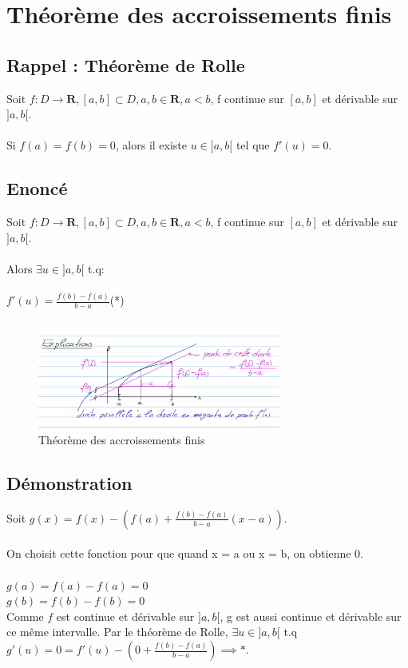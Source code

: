 \documentclass{article}
\begin{document}
\newpage

\section{Théorème des accroissements finis}

\subsection{Rappel : Théorème de Rolle}

Soit $ f : D \to \mathbf{R}, [a,b] \subset D, a, b \in \mathbf{R}, a < b $, f continue sur $ [a, b] $ et dérivable sur $]a, b[$.\\\\
Si $ f(a) = f(b) = 0 $, alors il existe $ u \in ]a, b[ $ tel que $ f'(u) = 0 $.

\subsection{Enoncé}

Soit $ f : D \to \mathbf{R}, [a,b] \subset D, a, b \in \mathbf{R}, a < b $, f continue sur $ [a, b] $ et dérivable sur $]a, b[$.\\\\
Alors $ \exists u \in ]a, b[$ t.q:\\\\
$ f'(u) = \frac{f(b) -f(a)}{b - a}$(*)\\\\
\begin{figure}[htp]
    \centering
    \includegraphics[width=8cm]{Images/accroissements.png}
    \caption{Théorème des accroissements finis}
\end{figure}

\subsection{Démonstration}

Soit $ g(x) = f(x) - (f(a) + \frac{f(b) - f(a)}{b - a}(x-a))$.\\\\
On choisit cette fonction pour que quand x = a ou x = b, on obtienne 0.\\\\
$ g(a) = f(a) - f(a) = 0 $\\
$ g(b) = f(b) - f(b) = 0 $\\
Comme $f$ est continue et dérivable sur $ ]a, b[$, g est aussi continue et dérivable sur ce même intervalle. Par le théorème de Rolle, $ \exists u \in ]a, b[ $ t.q $ g'(u) = 0 = f'(u) - (0 + \frac{f(b) - f(a)}{b - a}) \implies *$.
\end{document}
